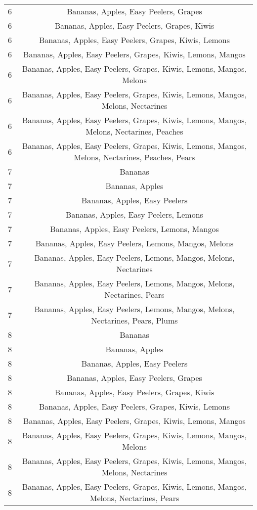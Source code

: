 \documentclass[11pt]{article}
\begin{document}
\begin{table}[h]
\begin{center}
\begin{tabular}{lc}
6 & Bananas, Apples, Easy Peelers, Grapes \\
6 & Bananas, Apples, Easy Peelers, Grapes, Kiwis \\
6 & Bananas, Apples, Easy Peelers, Grapes, Kiwis, Lemons \\
6 & Bananas, Apples, Easy Peelers, Grapes, Kiwis, Lemons, Mangos \\
6 & Bananas, Apples, Easy Peelers, Grapes, Kiwis, Lemons, Mangos, Melons \\
6 & Bananas, Apples, Easy Peelers, Grapes, Kiwis, Lemons, Mangos, Melons, Nectarines \\
6 & Bananas, Apples, Easy Peelers, Grapes, Kiwis, Lemons, Mangos, Melons, Nectarines, Peaches \\
6 & Bananas, Apples, Easy Peelers, Grapes, Kiwis, Lemons, Mangos, Melons, Nectarines, Peaches, Pears \\
7 & Bananas \\
7 & Bananas, Apples \\
7 & Bananas, Apples, Easy Peelers \\
7 & Bananas, Apples, Easy Peelers, Lemons \\
7 & Bananas, Apples, Easy Peelers, Lemons, Mangos \\
7 & Bananas, Apples, Easy Peelers, Lemons, Mangos, Melons \\
7 & Bananas, Apples, Easy Peelers, Lemons, Mangos, Melons, Nectarines \\
7 & Bananas, Apples, Easy Peelers, Lemons, Mangos, Melons, Nectarines, Pears \\
7 & Bananas, Apples, Easy Peelers, Lemons, Mangos, Melons, Nectarines, Pears, Plums \\
8 & Bananas \\
8 & Bananas, Apples \\
8 & Bananas, Apples, Easy Peelers \\
8 & Bananas, Apples, Easy Peelers, Grapes \\
8 & Bananas, Apples, Easy Peelers, Grapes, Kiwis \\
8 & Bananas, Apples, Easy Peelers, Grapes, Kiwis, Lemons \\
8 & Bananas, Apples, Easy Peelers, Grapes, Kiwis, Lemons, Mangos \\
8 & Bananas, Apples, Easy Peelers, Grapes, Kiwis, Lemons, Mangos, Melons \\
8 & Bananas, Apples, Easy Peelers, Grapes, Kiwis, Lemons, Mangos, Melons, Nectarines \\
8 & Bananas, Apples, Easy Peelers, Grapes, Kiwis, Lemons, Mangos, Melons, Nectarines, Pears \\

\end{tabular}
\end{center}
\end{table}
\end{document}
